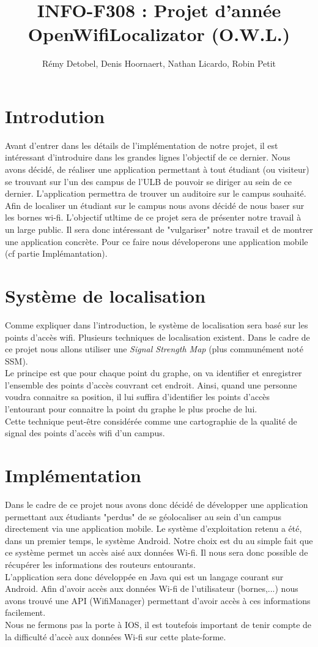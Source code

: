 \documentclass[a4paper,11pt]{article}
\title{INFO-F308 : Projet d'année \\ OpenWifiLocalizator (O.W.L.)}
\author{Rémy Detobel, Denis Hoornaert, Nathan Licardo, Robin Petit}
\begin{document}
\maketitle

\section{Introdution}
Avant d'entrer dans les détails de l'implémentation de notre projet, il est intéressant d'introduire dans les grandes lignes l'objectif de ce dernier.
Nous avons décidé, de réaliser une application permettant à tout étudiant (ou visiteur) se trouvant sur l'un des campus de l'ULB de pouvoir se diriger au sein de ce dernier. L'application permettra de trouver un auditoire sur le campus souhaité. Afin de localiser un étudiant sur le campus nous avons décidé de nous baser sur les bornes wi-fi. L'objectif utltime de ce projet sera de présenter notre travail à un large public. Il sera donc intéressant de "vulgariser" notre travail et de montrer une application concrète. Pour ce faire nous déveloperons une application mobile (cf partie Implémantation).

\section{Système de localisation}
  Comme expliquer dans l'introduction, le système de localisation sera basé sur les points d'accès wifi. Plusieurs techniques de localisation existent. Dans le cadre de ce projet nous allons utiliser une \textit{Signal Strength Map} (plus communément noté SSM).\\
  Le principe est que pour chaque point du graphe, on va identifier et enregistrer l'ensemble des points d'accès couvrant cet endroit. Ainsi, quand une personne voudra connaitre sa position, il lui suffira d'identifier les points d'accès l'entourant pour connaitre la point du graphe le plus proche de lui.\\
  Cette technique peut-être considérée comme une cartographie de la qualité de signal des points d'accès wifi d'un campus.
    
\section{Implémentation}
Dans le cadre de ce projet nous avons donc décidé de développer une application permettant aux étudiants "perdus" de se géolocaliser au sein d'un campus directement via une application mobile. Le système d'exploitation retenu a été, dans un premier temps, le système Android. Notre choix est du au simple fait que ce système permet un accès aisé aux données Wi-fi. Il nous sera donc possible de récupérer les informations des routeurs entourants.\\
L'application sera donc développée en Java qui est un langage courant sur Android. Afin d'avoir accès aux données Wi-fi de l'utilisateur (bornes,...) nous avons trouvé une API (WifiManager) permettant d'avoir accès à ces informations facilement.\\
Nous ne fermons pas la porte à IOS, il est toutefois important de tenir compte de la difficulté d'accè aux données Wi-fi sur cette plate-forme.
\end{document}
